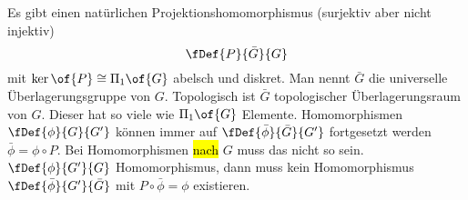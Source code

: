 Es gibt einen natürlichen Projektionshomomorphismus (surjektiv aber nicht injektiv)
\begin{equation}
	\fDef{P}{\bar{G}}{G}
\end{equation}
mit $\ker\of{P} \cong \Pi_1\of{G}$ abelsch und diskret. Man nennt $\bar{G}$ die universelle Überlagerungsgruppe von $G$. Topologisch ist $\bar{G}$ topologischer Überlagerungsraum von $G$. Dieser hat so viele  wie $\Pi_1\of{G}$ Elemente. Homomorphismen $\fDef{\phi}{G}{G'}$ können immer auf $\fDef{\bar{\phi}}{\bar{G}}{G'}$ fortgesetzt werden $\bar{\phi} = \phi \circ P$. Bei Homomorphismen \hl{nach} $G$ muss das nicht so sein. \dah $\fDef{\phi}{G'}{G}$ Homomorphismus, dann muss kein Homomorphismus $\fDef{\bar{\phi}}{G'}{\bar{G}}$ mit $P \circ \bar{\phi} = \phi$ existieren.